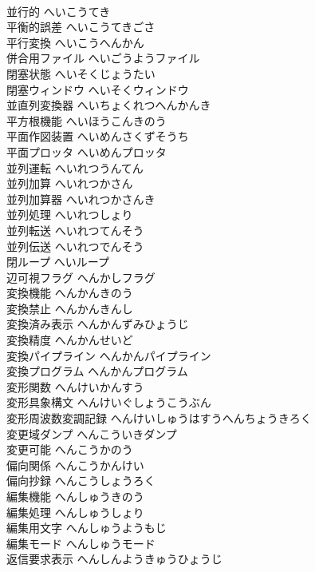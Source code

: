 \documentclass[8pt]{extreport}
\begin{document}
\begin{CJK}{UTF8}{min}
\\	並行的	へいこうてき	
\\	平衡的誤差	へいこうてきごさ	
\\	平行変換	へいこうへんかん	
\\	併合用ファイル	へいごうようファイル	
\\	閉塞状態	へいそくじょうたい	
\\	閉塞ウィンドウ	へいそくウィンドウ	
\\	並直列変換器	へいちょくれつへんかんき	
\\	平方根機能	へいほうこんきのう	
\\	平面作図装置	へいめんさくずそうち	
\\	平面プロッタ	へいめんプロッタ	
\\	並列運転	へいれつうんてん	
\\	並列加算	へいれつかさん	
\\	並列加算器	へいれつかさんき	
\\	並列処理	へいれつしょり	
\\	並列転送	へいれつてんそう	
\\	並列伝送	へいれつでんそう	
\\	閉ループ	へいループ	
\\	辺可視フラグ	へんかしフラグ	
\\	変換機能	へんかんきのう	
\\	変換禁止	へんかんきんし	
\\	変換済み表示	へんかんずみひょうじ	
\\	変換精度	へんかんせいど	
\\	変換パイプライン	へんかんパイプライン	
\\	変換プログラム	へんかんプログラム	
\\	変形関数	へんけいかんすう	
\\	変形具象構文	へんけいぐしょうこうぶん	
\\	変形周波数変調記録	へんけいしゅうはすうへんちょうきろく	
\\	変更域ダンプ	へんこういきダンプ	
\\	変更可能	へんこうかのう	
\\	偏向関係	へんこうかんけい	
\\	偏向抄録	へんこうしょうろく	
\\	編集機能	へんしゅうきのう	
\\	編集処理	へんしゅうしょり	
\\	編集用文字	へんしゅうようもじ	
\\	編集モード	へんしゅうモード	
\\	返信要求表示	へんしんようきゅうひょうじ	

\end{CJK}
\end{document}

